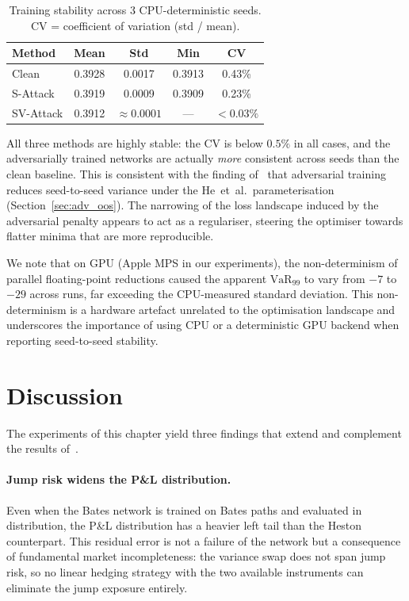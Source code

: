 \begin{table}[htbp]
  \centering
  \caption{Training stability across 3 CPU-deterministic seeds.
    CV = coefficient of variation (std / mean).}
  \label{tab:adv_stability}
  \begin{tabular}{lcccc}
    \hline
    Method    & Mean   & Std    & Min    & CV     \\
    \hline
    Clean     & 0.3928 & 0.0017 & 0.3913 & 0.43\% \\
    S-Attack  & 0.3919 & 0.0009 & 0.3909 & 0.23\% \\
    SV-Attack & 0.3912 & $\approx 0.0001$ & --- & $<0.03\%$ \\
    \hline
  \end{tabular}
\end{table}

All three methods are highly stable: the CV is below $0.5\%$ in all
cases, and the adversarially trained networks are actually \emph{more}
consistent across seeds than the clean baseline.  This is consistent with
the finding of~\citet{he2025} that adversarial training reduces
seed-to-seed variance under the He~et~al.\ parameterisation
(Section~\ref{sec:adv_oos}).  The narrowing of the loss landscape induced
by the adversarial penalty appears to act as a regulariser, steering the
optimiser towards flatter minima that are more reproducible.

We note that on GPU (Apple MPS in our experiments), the non-determinism
of parallel floating-point reductions caused the apparent $\mathrm{VaR}_{99}$
to vary from $-7$ to $-29$ across runs, far exceeding the CPU-measured
standard deviation.  This non-determinism is a hardware artefact unrelated
to the optimisation landscape and underscores the importance of using CPU
or a deterministic GPU backend when reporting seed-to-seed stability.

\section{Discussion}
\label{sec:bates_discussion}

The experiments of this chapter yield three findings that extend and
complement the results of~\citet{he2025}.

\paragraph{Jump risk widens the P\&L distribution.}
Even when the Bates network is trained on Bates paths and evaluated in
distribution, the P\&L distribution has a heavier left tail than the
Heston counterpart.  This residual error is not a failure of the network
but a consequence of fundamental market incompleteness: the variance swap
does not span jump risk, so no linear hedging strategy with the two
available instruments can eliminate the jump exposure entirely.


